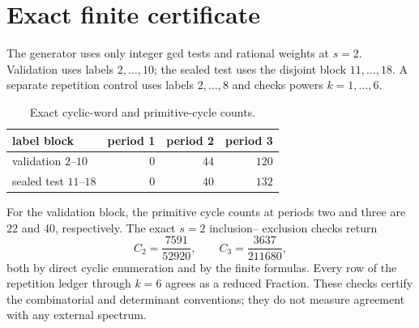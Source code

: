 \section{Exact finite certificate}

The generator uses only integer gcd tests and rational weights at \(s=2\).
Validation uses labels \(2,\ldots,10\); the sealed test uses the disjoint block
\(11,\ldots,18\).  A separate repetition control uses labels \(2,\ldots,8\)
and checks powers \(k=1,\ldots,6\).

\begin{table}[h]
\centering
\caption{Exact cyclic-word and primitive-cycle counts.}
\label{tab:counts}
\begin{tabular}{lrrr}
\toprule
label block & period 1 & period 2 & period 3\\
\midrule
validation \(2\)--\(10\) & \(0\) & \(44\) & \(120\)\\
sealed test \(11\)--\(18\) & \(0\) & \(40\) & \(132\)\\
\bottomrule
\end{tabular}
\end{table}

For the validation block, the primitive cycle counts at periods two and
three are \(22\) and \(40\), respectively.  The exact \(s=2\) inclusion--
exclusion checks return
\[
C_2=\frac{7591}{52920},\qquad
C_3=\frac{3637}{211680},
\]
both by direct cyclic enumeration and by the finite formulas.  Every row of
the repetition ledger through \(k=6\) agrees as a reduced Fraction.  These
checks certify the combinatorial and determinant conventions; they do not
measure agreement with any external spectrum.
